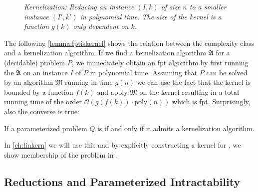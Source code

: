 

\begin{figure}
    \centering
    
    \caption{\textit{Kernelization: Reducing an instance $(I,k)$ of size $n$ to a smaller instance $(I', k')$ in polynomial time. The size of the kernel is a function $g(k)$ only dependent on $k$.}}
    \label{fig:kernelization}
\end{figure}


The following \cref{lemma:fptiskernel} shows the relation between the complexity class \FPT and a kernelization algorithm. 
If we find a kernelization algorithm $\mathfrak{A}$ for a (decidable) problem $P$, we immediately obtain an fpt algorithm by first running the $\mathfrak{A}$ on an instance $I$ of $P$ in polynomial time.
Assuming that $P$ can be solved by an algorithm $\mathfrak{M}$ running in time $g(n)$ we can use the fact that the kernel is bounded by a function $f(k)$ and apply $\mathfrak{M}$ on the kernel resulting in a  total running time of the order $\mathcal{O}(g(f(k)) \cdot \mathrm{poly}(n))$ which is fpt.
Surprisingly, also the converse is true:

\begin{lemma}\label{lemma:fptiskernel}
    If a parameterized problem $Q$ is \FPT if and only if it admits a kernelization algorithm.
\end{lemma}

 In \cref{ch:linkern} we will use this and by explicitly constructing a kernel for \psdom, we show membership of the problem in \FPT. 

\subsection{Reductions and Parameterized Intractability}

